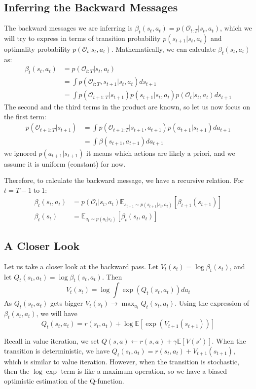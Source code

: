 \subsection{Inferring the Backward Messages}
The backward messages we are inferring is $\beta_t(s_t,a_t) = p(\mathcal{O}_{t:T}|s_t,a_t)$, which we will try to express in terms of transition probability $p(s_{t+1}|s_t,a_t)$ and optimality probability $p(\mathcal{O}_t|s_t,a_t)$. Mathematically, we can calculate $\beta_t(s_t,a_t)$ as:
\begin{align*}
    \beta_t(s_t,a_t)&=p(\mathcal{O}_{t:T}|s_t,a_t)\\
    &= \int p(\mathcal{O}_{t:T},s_{t+1}|s_t,a_t)ds_{t+1}\\
    &= \int p(\mathcal{O}_{t+1:T}|s_{t+1})p(s_{t+1}|s_t,a_t)p(\mathcal{O}_{t}|s_t,a_t)ds_{t+1}
\end{align*}
The second and the third terms in the product are known, so let us now focus on the first term:
\begin{align*}
p(\mathcal{O}_{t+1:T}|s_{t+1}) &= \int p(\mathcal{O}_{t+1:T}|s_{t+1},a_{t+1})p(a_{t+1}|s_{t+1})da_{t+1}\\
&=\int \beta(s_{t+1},a_{t+1})da_{t+1}
\end{align*}
we ignored $p(a_{t+1}|s_{t+1})$ it means which actions are likely a priori, and we assume it is uniform (constant) for now.

Therefore, to calculate the backward message, we have a recursive relation. For $t= T-1\;\text{to}\;1$:
\begin{align*}
    \beta_t(s_t,a_t) &= p(\mathcal{O}_{t}|s_t,a_t)\mathbb{E}_{s_{t+1}\sim p(s_{t+1}|s_t,a_t)}[\beta_{t+1}(s_{t+1})]\\
     \beta_t(s_t) &= \mathbb{E}_{a_{t}\sim p(a_t|s_t)}[\beta_t(s_t,a_t)]
\end{align*}

\subsection{A Closer Look}
Let us take a closer look at the backward pass. Let $V_t(s_t) = \log \beta_t(s_t)$, and let $Q_t(s_t,a_t) = \log \beta_t(s_t,a_t)$. Then 
$$V_t(s_t) = \log \int \exp (Q_t(s_t,a_t))da_t$$
As $Q_t(s_t,a_t)$ gets bigger $V_t(s_t)\rightarrow \max_{a_t}Q_t(s_t,a_t)$. Using the expression of $\beta_t(s_t,a_t)$, we will have
\[
Q_t(s_t,a_t) = r(s_t,a_t) + \log \mathbb{E}[\exp (V_{t+1}(s_{t+1}))]
\]

Recall in value iteration, we set $Q(s,a) \leftarrow r(s,a) + \gamma \mathbb{E}[V(s')]$. When the transition is deterministic, we have $Q_t(s_t,a_t) = r(s_t,a_t)+V_{t+1}(s_{t+1})$, which is similar to value iteration. However, when the transition is stochastic, then the $\log \exp$ term is like a maximum operation, so we have a biased optimistic estimation of the Q-function.

